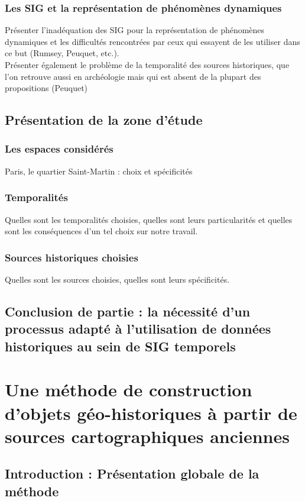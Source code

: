 \documentclass[a4paper,10pt]{article}
\begin{document}
\subsubsection{Les SIG et la représentation de phénomènes dynamiques}
Présenter l'inadéquation des SIG pour la représentation de phénomènes dynamiques et les difficultés
rencontrées par ceux qui essayent de les utiliser dans ce but (Rumsey, Peuquet, etc.).\\
Présenter également le problème de la temporalité des sources historiques, que l'on retrouve aussi
en archéologie mais qui est absent de la plupart des propositions (Peuquet)

\subsection{Présentation de la zone d'étude}
\subsubsection{Les espaces considérés}
Paris, le quartier Saint-Martin : choix et spécificités
\subsubsection{Temporalités}
Quelles sont les temporalités choisies, quelles sont leurs particularités et quelles sont les conséquences d'un
tel choix sur notre travail.
\subsubsection{Sources historiques choisies}
Quelles sont les sources choisies, quelles sont leurs spécificités.

\subsection{Conclusion de partie : la nécessité d'un processus adapté à l'utilisation de données historiques au sein 
de SIG temporels}

\section{Une méthode de construction d'objets géo-historiques à partir de sources cartographiques anciennes}
\subsection{Introduction : Présentation globale de la méthode}
\end{document}
